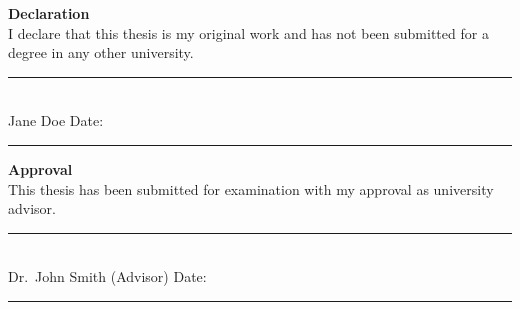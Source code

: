 
\thispagestyle{empty} %
\noindent\textbf{Declaration}\\[1em]
I declare that this thesis is my original work and has not been submitted for a degree in any other university.\\[3em]
\noindent\rule{0.5\linewidth}{0.4pt}\\
Jane Doe \hfill Date: \rule{0.25\linewidth}{0.4pt}

\vfill

\noindent\textbf{Approval}\\[1em]
This thesis has been submitted for examination with my approval as university advisor.\\[3em]
\noindent\rule{0.5\linewidth}{0.4pt}\\
Dr.~John Smith (Advisor) \hfill Date: \rule{0.25\linewidth}{0.4pt}
